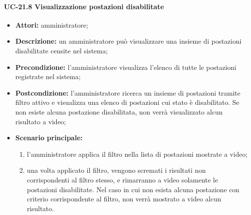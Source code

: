\paragraph{UC-21.8 Visualizzazione postazioni disabilitate}
\begin{itemize}
    \item \textbf{Attori:} amministratore;
    \item \textbf{Descrizione:} un amministratore pu\`{o} visualizzare una insieme di postazioni disabilitate censite nel sistema;
    \item \textbf{Precondizione:} l'amministratore visualizza l'elenco di tutte le postazioni registrate nel sistema;
    \item \textbf{Postcondizione:} l'amministratore ricerca un insieme di postazioni tramite filtro attivo e visualizza una elenco di postazioni cui stato è disabilitato. Se non esiste alcuna postazione disabilitata, non verrà visualizzato alcun risultato a video;
    \item \textbf{Scenario principale:}
    \begin{enumerate}
        \item l'amministratore applica il filtro nella lista di postazioni mostrate a video;
        \item una volta applicato il filtro, vengono scremati i risultati non corrispondenti al filtro stesso, e rimarranno a video solamente le postazioni disabilitate. Nel caso in cui non esista alcuna postazione con criterio corrispondente al filtro, non verrà mostrato a video alcun risultato.
    \end{enumerate}
\end{itemize}
    
